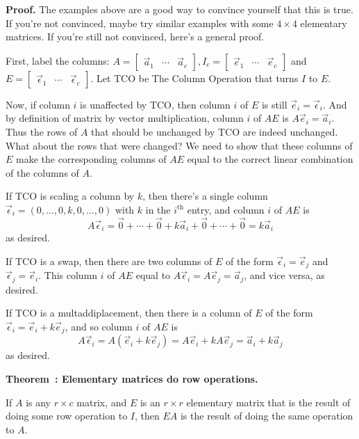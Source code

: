 \documentclass[11pt, letterpaper]{report}
\newenvironment{book}{}{}
\newcounter{example}[section]
\newcounter{theorem}[chapter]
\newenvironment{theorem}[1][]{\refstepcounter{theorem}\begin{bbox}\par
    \noindent\textbf{Theorem~\thetheorem: #1}}{\end{bbox}}
\newlength\oldfboxsep%
\newlength\myminiwidth%
\newenvironment{bbox}{%
  \setlength\oldfboxsep\fboxsep
  \setlength{\fboxsep}{.1in}%
  \setlength\myminiwidth\linewidth%
  \addtolength\myminiwidth{-0.2in}%
  \vspace{0.1in}%
  \begin{lrbox}{\bboxbox}\begin{minipage}{\myminiwidth}%
    }{%
    \end{minipage}\end{lrbox}%
  \noindent\fbox{\usebox{\bboxbox}}\vspace{0.1in}\setlength\fboxsep\oldfboxsep%
}
\begin{document}
\begin{book}
\textbf{Proof.} The examples above are a good way to convince yourself that this is true. If you're not convinced, maybe try similar examples with some $4\times 4$ elementary matrices. If you're still not convinced, here's a general proof.

First, label the columns: $A = \begin{bmatrix}
\vec{a}_1 & \cdots & \vec{a}_c
\end{bmatrix}, I_c = \begin{bmatrix}
\vec{e}_1 & \cdots & \vec{e}_c
\end{bmatrix}$ and $E = \begin{bmatrix}
\vec{\epsilon}_1 & \cdots & \vec{\epsilon}_c
\end{bmatrix}$. Let TCO be The Column Operation that turns $I$ to $E$.

Now, if column $i$ is unaffected by TCO, then column $i$ of $E$ is still $\vec{e}_i=\vec{\epsilon}_i$. And by definition of matrix by vector multiplication, column $i$ of $AE$ is $A\vec{e}_i =\vec{a}_i$. Thus the rows of $A$ that should be unchanged by TCO are indeed unchanged. What about the rows that were changed? We need to show that these columns of $E$ make the corresponding columns of $AE$ equal to the correct linear combination of the columns of $A$.

If TCO is scaling a column by $k$, then there's a single column $\vec{\epsilon}_i = (0,\ldots,0,k,0,\ldots,0)$ with $k$ in the $i^{\text{th}}$ entry, and column $i$ of $AE$ is 
\[A\vec{\epsilon}_i = \vec{0}+ \cdots + \vec{0} + k\vec{a}_i+ \vec{0} + \cdots + \vec{0} = k\vec{a}_i\]
as desired.

If TCO is a swap, then there are two columns of $E$ of the form $\vec{\epsilon}_i=\vec{e}_j$ and $\vec{\epsilon}_j=\vec{e}_i$. This column $i$ of $AE$ equal to $A\vec{\epsilon}_i = A \vec{e}_j = \vec{a}_j$, and vice versa, as desired.

If TCO is a multaddiplacement, then there is a column of $E$ of the form $\vec{\epsilon}_i=\vec{e}_i+k\vec{e}_j$, and so column $i$ of $AE$ is
\[A\vec{\epsilon}_i= A(\vec{e}_i+k\vec{e}_j) = A\vec{e}_i+kA\vec{e}_j = \vec{a}_i+k\vec{a}_j\]
as desired. \blacksquare
\end{book}

\begin{theorem}[Elementary matrices do row operations.]\label{theorem:elementary-operations} 

If $A$ is any $r\times c$ matrix, and $E$ is an $r\times r$ elementary matrix that is the result of doing some row operation to $I$, then $EA$ is the result of doing the same operation to $A$.
\end{theorem}
\end{document}
